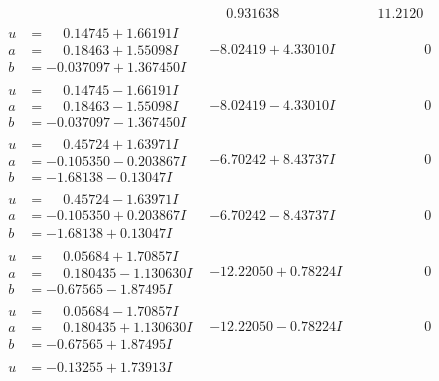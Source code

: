 \documentclass[1p]{elsarticle_modified}
\theoremstyle{definition}
\begin{document}
$$\begin{array}{c|c|c}
 & \phantom{-}0.931638\phantom{ +0.000000I} & \phantom{-}11.2120\phantom{ +0.000000I} \\ \hline\begin{aligned}
u &= \phantom{-}0.14745 + 1.66191 I \\
a &= \phantom{-}0.18463 + 1.55098 I \\
b &= -0.037097 + 1.367450 I\end{aligned}
 & -8.02419 + 4.33010 I & \phantom{-0.000000 } 0 \\ \hline\begin{aligned}
u &= \phantom{-}0.14745 - 1.66191 I \\
a &= \phantom{-}0.18463 - 1.55098 I \\
b &= -0.037097 - 1.367450 I\end{aligned}
 & -8.02419 - 4.33010 I & \phantom{-0.000000 } 0 \\ \hline\begin{aligned}
u &= \phantom{-}0.45724 + 1.63971 I \\
a &= -0.105350 - 0.203867 I \\
b &= -1.68138 - 0.13047 I\end{aligned}
 & -6.70242 + 8.43737 I & \phantom{-0.000000 } 0 \\ \hline\begin{aligned}
u &= \phantom{-}0.45724 - 1.63971 I \\
a &= -0.105350 + 0.203867 I \\
b &= -1.68138 + 0.13047 I\end{aligned}
 & -6.70242 - 8.43737 I & \phantom{-0.000000 } 0 \\ \hline\begin{aligned}
u &= \phantom{-}0.05684 + 1.70857 I \\
a &= \phantom{-}0.180435 - 1.130630 I \\
b &= -0.67565 - 1.87495 I\end{aligned}
 & -12.22050 + 0.78224 I & \phantom{-0.000000 } 0 \\ \hline\begin{aligned}
u &= \phantom{-}0.05684 - 1.70857 I \\
a &= \phantom{-}0.180435 + 1.130630 I \\
b &= -0.67565 + 1.87495 I\end{aligned}
 & -12.22050 - 0.78224 I & \phantom{-0.000000 } 0 \\ \hline\begin{aligned}
u &= -0.13255 + 1.73913 I \\

\end{aligned}
\end{array}$$
\end{document}
